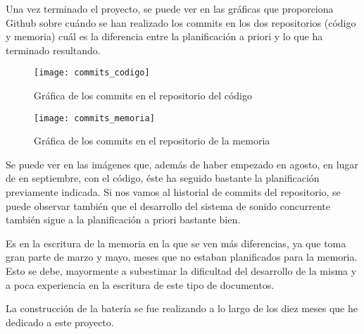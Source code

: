             Una vez terminado el proyecto, se puede ver en las gráficas que proporciona Github sobre cuándo se han
            realizado los commits en los dos repositorios (código y memoria) cuál es la diferencia entre la
            planificación a priori y lo que ha terminado resultando.

            \begin{figure}[ht]
                \centering
                \texttt{[image: commits\_codigo]}
                \caption{Gráfica de los commits en el repositorio del código\label{fig:CommitsCodigo}}
            \end{figure}

            \begin{figure}[ht]
                \centering
                \texttt{[image: commits\_memoria]}
                \caption{Gráfica de los commits en el repositorio de la memoria\label{fig:CommitsMemoria}}
            \end{figure}

            Se puede ver en las imágenes que, además de haber empezado en agosto, en lugar de en septiembre, con el
            código, éste ha seguido bastante la planificación previamente indicada. Si nos vamos al historial de commits
            del repositorio, se puede observar también que el desarrollo del sistema de sonido concurrente también sigue
            a la planificación a priori bastante bien.

            Es en la escritura de la memoria en la que se ven más diferencias, ya que toma gran parte de marzo y mayo,
            meses que no estaban planificados para la memoria. Esto se debe, mayormente a subestimar la dificultad del
            desarrollo de la misma y a poca experiencia en la escritura de este tipo de documentos.

            La construcción de la batería se fue realizando a lo largo de los diez meses que he dedicado a este
            proyecto.




\newpage